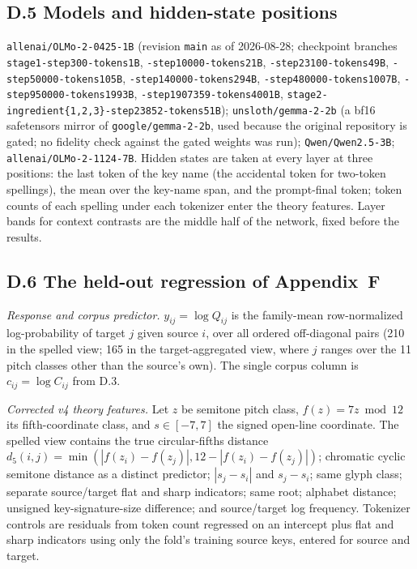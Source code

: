 \documentclass[11pt]{article}
\begin{document}
\subsection*{D.5 Models and hidden-state positions}
\texttt{allenai/OLMo-2-0425-1B} (revision \texttt{main} as of 2026-08-28; checkpoint branches \texttt{stage1-step300-tokens1B}, \texttt{-step10000-tokens21B}, \texttt{-step23100-tokens49B}, \texttt{-step50000-tokens105B}, \texttt{-step140000-tokens294B}, \texttt{-step480000-tokens1007B}, \texttt{-step950000-tokens1993B}, \texttt{-step1907359-tokens4001B}, \texttt{stage2-ingredient\{1,2,3\}-step23852-tokens51B}); \texttt{unsloth/gemma-2-2b} (a bf16 safetensors mirror of \texttt{google/gemma-2-2b}, used because the original repository is gated; no fidelity check against the gated weights was run); \texttt{Qwen/Qwen2.5-3B}; \texttt{allenai/OLMo-2-1124-7B}. Hidden states are taken at every layer at three positions: the last token of the key name (the accidental token for two-token spellings), the mean over the key-name span, and the prompt-final token; token counts of each spelling under each tokenizer enter the theory features. Layer bands for context contrasts are the middle half of the network, fixed before the results.

\subsection*{D.6 The held-out regression of Appendix~F}
\emph{Response and corpus predictor.} $y_{ij}=\log Q_{ij}$ is the family-mean row-normalized log-probability of target $j$ given source $i$, over all ordered off-diagonal pairs (210 in the spelled view; 165 in the target-aggregated view, where $j$ ranges over the 11 pitch classes other than the source's own). The single corpus column is $c_{ij}=\log C_{ij}$ from D.3.

\emph{Corrected v4 theory features.} Let $z$ be semitone pitch class, $f(z)=7z\bmod12$ its fifth-coordinate class, and $s\in[-7,7]$ the signed open-line coordinate. The spelled view contains the true circular-fifths distance $d_5(i,j)=\min(|f(z_i)-f(z_j)|,12-|f(z_i)-f(z_j)|)$; chromatic cyclic semitone distance as a distinct predictor; $|s_j-s_i|$ and $s_j-s_i$; same glyph class; separate source/target flat and sharp indicators; same root; alphabet distance; unsigned key-signature-size difference; and source/target log frequency. Tokenizer controls are residuals from token count regressed on an intercept plus flat and sharp indicators using only the fold's training source keys, entered for source and target.
\end{document}
